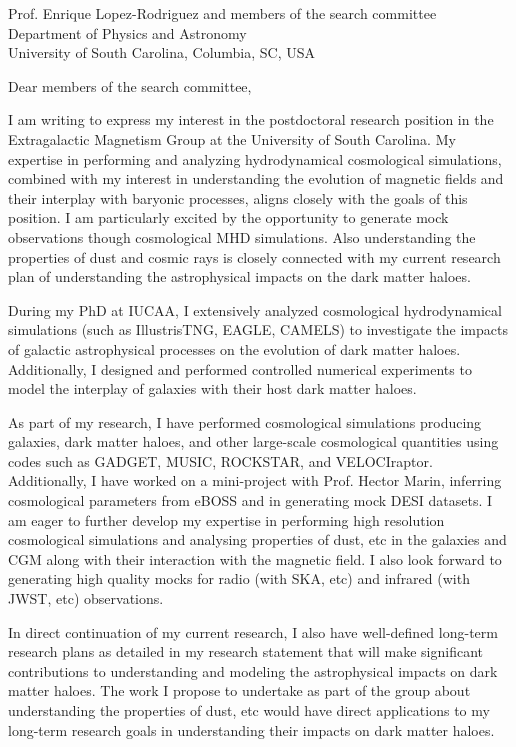 \documentclass[11pt]{letter}
\begin{document}
\begin{letter}{Prof. Enrique Lopez-Rodriguez and members of the search committee \\ Department of Physics and Astronomy \\ University of South Carolina, Columbia, SC, USA}

\opening{Dear members of the search committee,}

I am writing to express my interest in the postdoctoral research position in the Extragalactic Magnetism Group at the University of South Carolina. My expertise in performing and analyzing hydrodynamical cosmological simulations, combined with my interest in understanding the evolution of magnetic fields and their interplay with baryonic processes, aligns closely with the goals of this position. I am particularly excited by the opportunity to generate mock observations though cosmological MHD simulations. Also understanding the properties of dust and cosmic rays is closely connected with my current research plan of understanding the astrophysical impacts on the dark matter haloes.

During my PhD at IUCAA, I extensively analyzed cosmological hydrodynamical simulations (such as IllustrisTNG, EAGLE, CAMELS) to investigate the impacts of  galactic astrophysical processes on the evolution of dark matter haloes. Additionally, I designed and performed controlled numerical experiments to model the interplay of galaxies with their host dark matter haloes.

As part of my research, I have performed cosmological simulations producing galaxies, dark matter haloes, and other large-scale cosmological quantities using codes such as GADGET, MUSIC, ROCKSTAR, and VELOCIraptor. Additionally, I have worked on a mini-project with Prof. Hector Marin, inferring cosmological parameters from eBOSS and in generating mock DESI datasets. I am eager to further develop my expertise in performing high resolution cosmological simulations and analysing properties of dust, etc in the galaxies and CGM along with their interaction with the magnetic field. I also look forward to generating high quality mocks for radio (with SKA, etc) and infrared (with JWST, etc) observations.

In direct continuation of my current research, I also have well-defined long-term research plans as detailed in my research statement that will make significant contributions to understanding and modeling the astrophysical impacts on dark matter haloes. The work I propose to undertake as part of the group about understanding the properties of dust, etc would have direct applications to my long-term research goals in understanding their impacts on dark matter haloes.


\end{letter}
\end{document}
